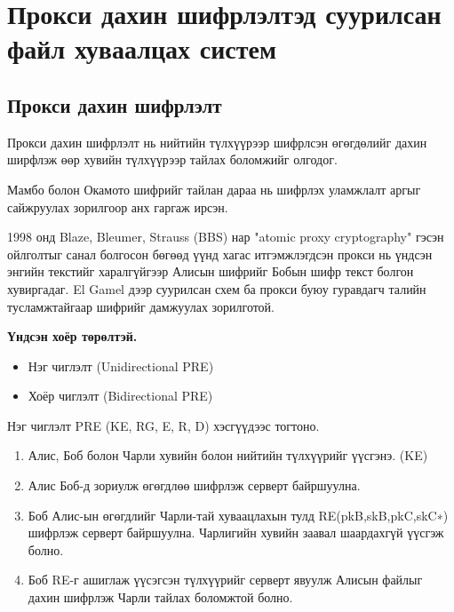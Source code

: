 
\chapter{Прокси дахин шифрлэлтэд суурилсан файл хуваалцах систем} %
\label{Chapter2} %
\pagecolor{white}

\section{Прокси дахин шифрлэлт}
Прокси дахин шифрлэлт нь нийтийн түлхүүрээр шифрлсэн өгөгдөлийг дахин ширфлэж өөр хувийн түлхүүрээр тайлах боломжийг олгодог.

Мамбо болон Окамото шифрийг тайлан дараа нь шифрлэх уламжлалт аргыг сайжруулах зорилгоор анх гаргаж ирсэн.

1998 онд Blaze, Bleumer, Strauss (BBS) нар "atomic proxy cryptography" гэсэн ойлголтыг санал болгосон бөгөөд үүнд хагас итгэмжлэгдсэн прокси нь үндсэн энгийн текстийг харалгүйгээр Алисын шифрийг Бобын шифр текст болгон хувиргадаг. El Gamel дээр суурилсан схем ба прокси буюу гуравдагч талийн тусламжтайгаар шифрийг дамжуулах зорилготой. 

\textbf{Үндсэн хоёр төрөлтэй.}
\begin{itemize}
    \item Нэг чиглэлт (Unidirectional PRE)
    \item Хоёр чиглэлт (Bidirectional PRE)
\end{itemize}

Нэг чиглэлт PRE (KE, RG, E, R, D) хэсгүүдээс тогтоно.

\begin{enumerate}
    \item Алис, Боб болон Чарли хувийн болон нийтийн түлхүүрийг үүсгэнэ. (KE)
    \item Алис Боб-д зориулж өгөгдлөө шифрлэж серверт байршуулна.
    \item Боб Алис-ын өгөгдлийг Чарли-тай хуваацлахын тулд RE(pkB,skB,pkC,skC∗) шифрлэж серверт байршуулна. Чарлигийн хувийн заавал шаардахгүй үүсгэж болно.
    \item Боб RE-г ашиглаж үүсэгсэн түлхүүрийг серверт явуулж Алисын файлыг дахин шифрлэж Чарли тайлах боломжтой болно.
\end{enumerate}

